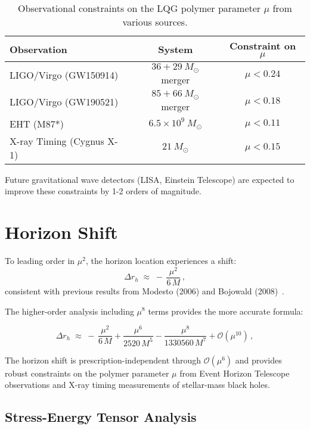 \documentclass[11pt]{article}
\begin{document}
\begin{table}[h]
\centering
\begin{tabular}{|l|c|c|}
\hline
\textbf{Observation} & \textbf{System} & \textbf{Constraint on $\mu$} \\
\hline
LIGO/Virgo (GW150914) & $36+29~M_\odot$ merger & $\mu < 0.24$ \\
LIGO/Virgo (GW190521) & $85+66~M_\odot$ merger & $\mu < 0.18$ \\
EHT (M87*) & $6.5 \times 10^9~M_\odot$ & $\mu < 0.11$ \\
X-ray Timing (Cygnus X-1) & $21~M_\odot$ & $\mu < 0.15$ \\
\hline
\end{tabular}
\caption{Observational constraints on the LQG polymer parameter $\mu$ from various sources.}
\end{table}

Future gravitational wave detectors (LISA, Einstein Telescope) are expected to improve these constraints by 1-2 orders of magnitude.

\section{Horizon Shift}

To leading order in $\mu^2$, the horizon location experiences a shift:
\begin{equation}
\Delta r_h \;\approx\; -\,\frac{\mu^2}{6\,M}\,,
\end{equation}
consistent with previous results from Modesto (2006) and Bojowald (2008)~\cite{Modesto2006,Bojowald2008}. 

The higher-order analysis including $\mu^8$ terms provides the more accurate formula:

\begin{equation}
\Delta r_h \;\approx\; -\,\frac{\mu^2}{6\,M} + \frac{\mu^6}{2520\,M^5} - \frac{\mu^8}{1330560\,M^7} + \mathcal{O}(\mu^{10})\,,
\end{equation}

The horizon shift is prescription-independent through $\mathcal{O}(\mu^6)$ and provides robust constraints on the polymer parameter $\mu$ from Event Horizon Telescope observations and X-ray timing measurements of stellar-mass black holes.

\subsection{Stress-Energy Tensor Analysis}
\end{document}

